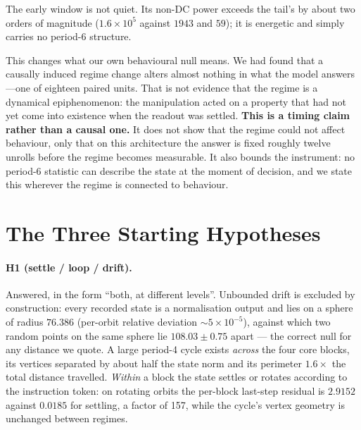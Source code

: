 \documentclass{zapiski}
\begin{document}
The early window is not quiet. Its non-DC power exceeds the tail's by about two orders of
magnitude ($1.6\times10^{5}$ against $1943$ and $59$); it is energetic and simply carries no
period-6 structure.

This changes what our own behavioural null means. We had found that a causally induced regime
change alters almost nothing in what the model answers---one of eighteen paired units. That is
not evidence that the regime is a dynamical epiphenomenon: the manipulation acted on a property
that had not yet come into existence when the readout was settled. \textbf{This is a timing
claim rather than a causal one.} It does not show that the regime could not affect behaviour,
only that on this architecture the answer is fixed roughly twelve unrolls before the regime
becomes measurable. It also bounds the instrument: no period-6 statistic can describe the state
at the moment of decision, and we state this wherever the regime is connected to behaviour.

\section{The Three Starting Hypotheses}

\paragraph{H1 (settle / loop / drift).} Answered, in the form ``both, at different levels''.
Unbounded drift is excluded by construction: every recorded state is a normalisation output and
lies on a sphere of radius $76.386$ (per-orbit relative deviation $\sim\!5\times10^{-5}$), against
which two random points on the same sphere lie $108.03 \pm 0.75$ apart --- the correct null for any
distance we quote. A large period-4 cycle exists \emph{across} the four core blocks, its vertices
separated by about half the state norm and its perimeter $1.6\times$ the total distance travelled.
\emph{Within} a block the state settles or rotates according to the instruction token: on rotating
orbits the per-block last-step residual is $2.9152$ against $0.0185$ for settling, a factor of 157,
while the cycle's vertex geometry is unchanged between regimes.
\end{document}
